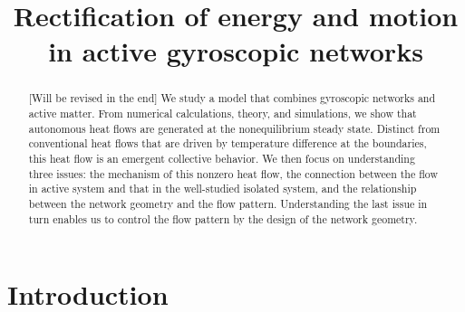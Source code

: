 \documentclass[
 preprint,
 preprintnumbers,
 amsmath,amssymb,
 aps,
 pre,
 longbibliography,
 10pt, twocolumn
]{revtex4-1}
\begin{document}
\newcommand{\eqnname}{Eqn.}
\newcommand{\secname}{Sec.}


\title{Rectification of energy and motion in active gyroscopic networks}



\begin{abstract}
[Will be revised in the end] We study a model that combines gyroscopic networks and active matter. From numerical calculations, theory, and simulations, we show that autonomous heat flows are generated at the nonequilibrium steady state. Distinct from conventional heat flows that are driven by temperature difference at the boundaries, this heat flow is an emergent collective behavior. 
We then focus on understanding three issues: the mechanism of this nonzero heat flow, the connection between the flow in active system and that in the well-studied isolated system, and the relationship between the network geometry and the flow pattern. 
Understanding the last issue in turn enables us to control the flow pattern by the design of the network geometry.
\end{abstract}


\maketitle



\section{Introduction} \label{sec:intro}
\end{document}
